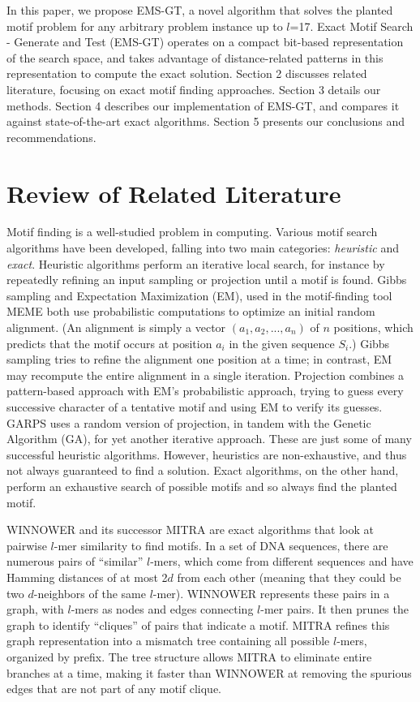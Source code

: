 \documentclass{acm_proc_article-sp}
\begin{document}
	In this paper, we propose EMS-GT, a novel algorithm that solves the planted motif problem for any arbitrary problem instance up to $l$=17. Exact Motif Search - Generate and Test (EMS-GT) operates on a compact bit-based representation of the search space, and takes advantage of distance-related patterns in this representation to compute the exact solution. Section 2 discusses related literature, focusing on exact motif finding approaches. Section 3 details our methods. Section 4 describes our implementation of EMS-GT, and compares it against state-of-the-art exact algorithms. Section 5 presents our conclusions and recommendations.

\section{Review of Related Literature}

	Motif finding is a well-studied problem in computing. Various motif search algorithms have been developed, falling into two main categories: \emph{heuristic} and \emph{exact}.
	Heuristic algorithms perform an iterative local search, for instance by repeatedly refining an input sampling or projection until a motif is found. Gibbs sampling \cite{lawrence1993detecting} and Expectation Maximization (EM), used in the motif-finding tool MEME \cite{lawrence1990expectation,bailey1995unsupervised} both use probabilistic computations to optimize an initial random alignment. (An alignment is simply a vector $(a_{1}, a_{2},...,a_{n})$ of $n$ positions, which predicts that the motif occurs at position $a_{i}$ in the given sequence $S_{i}$.) Gibbs sampling tries to refine the alignment one position at a time; in contrast, EM may recompute the entire alignment in a single iteration. Projection \cite{blanchette2002discovery} combines a pattern-based approach with EM's probabilistic approach,  trying to guess every successive character of a tentative motif and using EM to verify its guesses. GARPS \cite{huo2009combining} uses a random version of projection, in tandem with the Genetic Algorithm (GA), for yet another iterative approach. These are just some of many successful heuristic algorithms. However, heuristics are non-exhaustive, and thus not always guaranteed to find a solution. Exact algorithms, on the other hand, perform an exhaustive search of possible motifs and so always find the planted motif. 

	WINNOWER \cite{pevzner2000combinatorial} and its successor MITRA \cite{eskin2002finding} are exact algorithms that look at pairwise $l$-mer similarity to find motifs. In a set of DNA sequences, there are numerous pairs of ``similar'' $l$-mers, which come from different sequences and have Hamming distances of at most 2$d$ from each other (meaning that they could be two $d$-neighbors of the same $l$-mer). WINNOWER represents these pairs in a graph, with $l$-mers as nodes and edges connecting $l$-mer pairs. It then prunes the graph to identify ``cliques'' of pairs that indicate a motif. MITRA refines this graph representation into a mismatch tree containing all possible $l$-mers, organized by prefix. The tree structure allows MITRA to eliminate entire branches at a time, making it faster than WINNOWER at removing the spurious edges that are not part of any motif clique.
\end{document}
